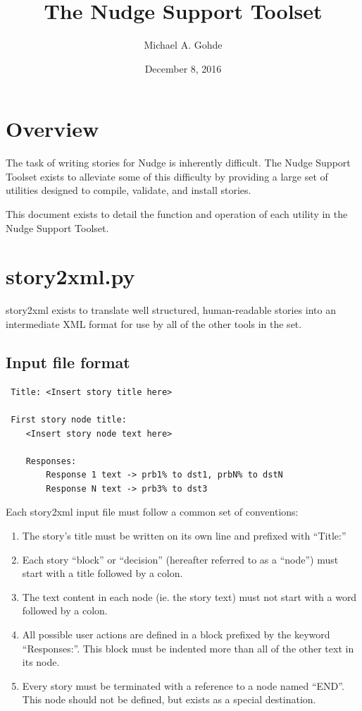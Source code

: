 \documentclass[12pt,letterpaper]{article}
\begin{document}
 
 \title{The Nudge Support Toolset}
 \author{Michael A. Gohde}
 \date{December 8, 2016}
 \maketitle
 
 \section{Overview}
 The task of writing stories for Nudge is inherently difficult. The Nudge
 Support Toolset exists to alleviate some of this difficulty by providing
 a large set of utilities designed to compile, validate, and install stories.
 
 This document exists to detail the function and operation of each utility
 in the Nudge Support Toolset.
 
 \section{story2xml.py}
 story2xml exists to translate well structured, human-readable stories into 
 an intermediate XML format for use by all of the other tools in the set.
 
 \subsection{Input file format}
 \lstset{numbers=left, frame=shadowbox}
 \begin{lstlisting}
 Title: <Insert story title here>
 
 First story node title:
    <Insert story node text here>
    
    Responses:
        Response 1 text -> prb1% to dst1, prbN% to dstN
        Response N text -> prb3% to dst3
 \end{lstlisting}
 
 Each story2xml input file must follow a common set of conventions:
 \begin{enumerate}
   \item The story's title must be written on its own line and prefixed with ``Title:''
   \item Each story ``block'' or ``decision'' (hereafter referred to as a ``node'') must start with a title followed by a colon.
   \item The text content in each node (ie. the story text) must not start with a word followed by a colon.
   \item All possible user actions are defined in a block prefixed by the keyword ``Responses:''. This block must be indented more than all of the other text in its node.
   \item Every story must be terminated with a reference to a node named ``END''. This node should not be defined, but exists as a special destination.
 \end{enumerate}
 
\end{document}
